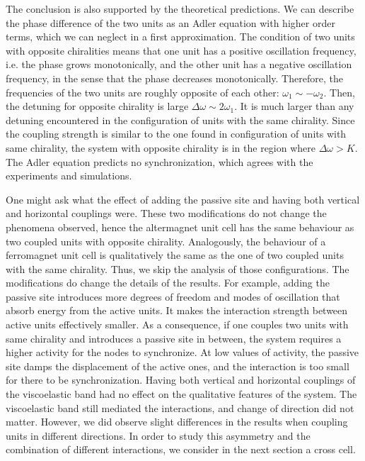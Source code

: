 \documentclass[11pt, a4paper]{article} %
\begin{document}
The conclusion is also supported by the theoretical predictions. We can describe the phase difference of the two units as 
an Adler equation with higher order terms, which we can neglect in a first approximation. The condition of two units with 
opposite chiralities means that one unit has a positive oscillation frequency, i.e. the phase grows monotonically, and the 
other unit has a negative oscillation frequency, in the sense that the phase decreases monotonically. Therefore, the 
frequencies of the two units are roughly opposite of each other: $\omega_1 \sim -\omega_2$. Then, the detuning for 
opposite chirality is large $\Delta \omega \sim 2\omega_1$. It is much larger than any detuning encountered in the 
configuration of units with the same chirality. Since the coupling strength is similar to the one found in configuration 
of units with same chirality, the system with opposite chirality is in the region where $\Delta \omega > K$. The Adler 
equation predicts no synchronization, which agrees with the experiments and simulations. 

One might ask what the effect of adding the passive site and having both vertical and horizontal couplings were. 
These two modifications do not change the phenomena observed, hence the altermagnet unit cell has the same behaviour 
as two coupled units with opposite chirality. Analogously, the behaviour of a ferromagnet unit cell is qualitatively 
the same as the one of two coupled units with the same chirality. Thus, we skip the analysis of those configurations. 
The modifications do change the details of the results. For example, adding the 
passive site introduces more degrees of freedom and modes of oscillation that absorb energy from the active units. 
It makes the interaction strength between active units effectively smaller. As a consequence, if one couples two units with 
same chirality and introduces a passive site in between, the system requires a higher activity for the nodes to synchronize. 
At low values of activity, the passive site damps the displacement of the active ones, and the interaction is too 
small for there to be synchronization. Having both vertical and horizontal 
couplings of the viscoelastic band had no effect on the qualitative features of the system. The viscoelastic band still 
mediated the interactions, and change of direction did not matter. However, we did observe slight differences
in the results when coupling units in different directions. In order to study this asymmetry and the combination 
of different interactions, we consider in the next section a cross cell. 
\end{document}
